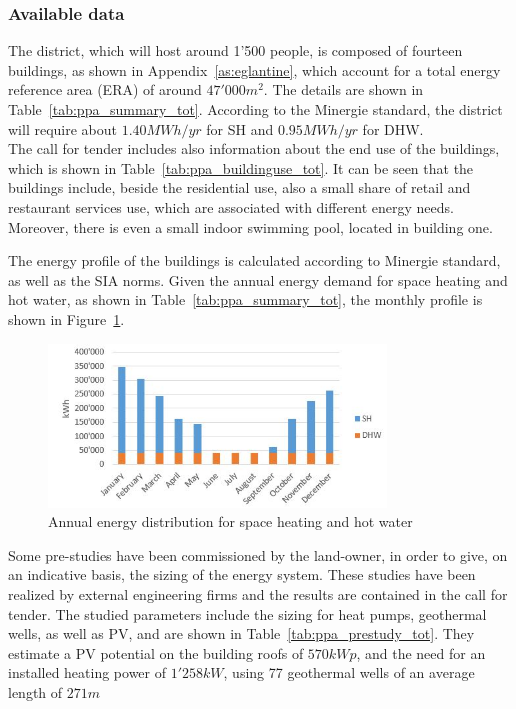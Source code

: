 \documentclass{article}
\begin{document}
\subsubsection{Available data}
The district, which will host around 1'500 people, is composed of fourteen buildings, as shown in Appendix~\ref{as:eglantine}, which account for a total energy reference area (ERA) of around $47'000 m^{2}$. The details are shown in Table~\ref{tab:ppa_summary_tot}. According to the Minergie standard, the district will require about $1.40 MWh/yr$ for SH and $0.95 MWh/yr$ for DHW.\\



The call for tender includes also information about the end use of the buildings, which is shown in Table~\ref{tab:ppa_buildinguse_tot}. It can be seen that the buildings include, beside the residential use, also a small share of retail and restaurant services use, which are associated with different energy needs. Moreover, there is even a small indoor swimming pool, located in building one. 



The energy profile of the buildings is calculated according to Minergie standard, as well as the SIA norms. Given the annual energy demand for space heating and hot water, as shown in Table~\ref{tab:ppa_summary_tot}, the monthly profile is shown in Figure~\ref{fig:ppa_energydemand}.

\begin{figure}[htp]
\centering
\includegraphics[width=0.8\textwidth]{ppa_energydemand.JPG}
\caption{Annual energy distribution for space heating and hot water}
\label{fig:ppa_energydemand}
\end{figure}

Some pre-studies have been commissioned by the land-owner, in order to give, on an indicative basis, the sizing of the energy system. These studies have been realized by external engineering firms and the results are contained in the call for tender. The studied parameters include the sizing for heat pumps, geothermal wells, as well as PV, and are shown in Table~\ref{tab:ppa_prestudy_tot}. They estimate a PV potential on the building roofs of $570 kWp$, and the need for an installed heating power of $1'258 kW$, using 77 geothermal wells of an average length of $271 m$
\end{document}
